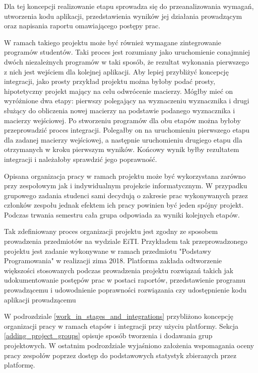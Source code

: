 Dla tej koncepcji realizowanie etapu sprowadza się do przeanalizowania wymagań, utworzenia kodu aplikacji, przedstawienia wyników jej działania prowadzącym oraz napisania raportu omawiającego postępy prac.

W ramach takiego projektu może być również wymagane zintegrowanie programów studentów.
Taki proces jest rozumiany jako uruchomienie conajmniej dwóch niezależnych programów w taki sposób, że rezultat wykonania pierwszego z nich jest wejściem dla kolejnej aplikacji.
Aby lepiej przybliżyć koncepcję integracji, jako prosty przykład projektu można byłoby podać prosty, hipotetyczny projekt mający na celu odwrócenie macierzy.
Mógłby mieć on wyróżnione dwa etapy: pierwszy polegający na wyznaczeniu wyznacznika i drugi służący do obliczenia nowej macierzy na podstawie podanego wyznacznika i macierzy wejściowej.
Po stworzeniu programów dla obu etapów można byłoby przeprowadzić proces integracji.
Polegałby on na uruchomieniu pierwszego etapu dla zadanej macierzy wejściowej, a następnie uruchomieniu drugiego etapu dla otrzymanych w kroku pierwszym wyników.
Końcowy wynik byłby rezultatem integracji i należałoby sprawdzić jego poprawność.

Opisana organizacja pracy w ramach projektu może być wykorzystana zarówno przy zespołowym jak i indywidualnym projekcie informatycznym.
W przypadku grupowego zadania studenci sami decydują o zakresie prac wykonywanych przez członków zespołu jednak efektem ich pracy powinien być jeden spójny projekt.
Podczas trwania semestru cała grupa odpowiada za wyniki kolejnych etapów.

Tak zdefiniowany proces organizacji projektu jest zgodny ze sposobem prowadzenia przedmiotów na wydziale EiTI.
Przykładem tak przeprowadzonego projektu jest zadanie wykonywane w ramach przedmiotu "Podstawy Programowania" w realizacji zima 2018.
Platforma zakłada odtworzenie większości stosowanych podczas prowadzenia projektu rozwiązań takich jak udokumentowanie postępów prac w postaci raportów, przedstawienie programu prowadzącemu i udowodnienie poprawności rozwiązania czy udostępnienie kodu aplikacji prowadzącemu

W podrozdziale \ref{work_in_stages_and_integrations} przybliżono koncepcję organizacji pracy w ramach etapów i integracji przy użyciu platformy.
Sekcja \ref{adding_project_groups} opisuje sposób tworzenia i dodawania grup projektowych.
W ostatnim podrozdziale wyjaśniono założenia wspomagania oceny pracy zespołów poprzez dostęp do podstawowych statystyk zbieranych przez platformę.


